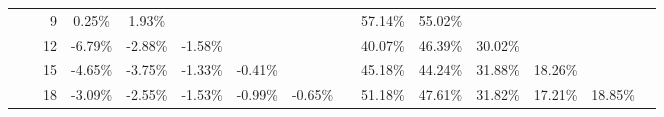 \begin{table}[t]
{\begin{tabular}{ccrcccccccccccc}
          & \textcolor[rgb]{ .502,  .502,  .502}{} & 9     & \cellcolor[rgb]{ .988,  .988,  1}0.25\% & \cellcolor[rgb]{ .969,  .976,  .996}1.93\% &       &       &       &       & \cellcolor[rgb]{ .353,  .541,  .776}57.14\% & \cellcolor[rgb]{ .38,  .561,  .788}55.02\% &       &       &       &  \\
          & \textcolor[rgb]{ .502,  .502,  .502}{} & 12    & \cellcolor[rgb]{ .984,  .843,  .855}-6.79\% & \cellcolor[rgb]{ .984,  .925,  .937}-2.88\% & \cellcolor[rgb]{ .984,  .953,  .965}-1.58\% &       &       &       & \cellcolor[rgb]{ .545,  .678,  .847}40.07\% & \cellcolor[rgb]{ .475,  .627,  .82}46.39\% & \cellcolor[rgb]{ .655,  .757,  .886}30.02\% &       &       &  \\
          & \textcolor[rgb]{ .502,  .502,  .502}{} & 15    & \cellcolor[rgb]{ .984,  .89,  .898}-4.65\% & \cellcolor[rgb]{ .984,  .906,  .918}-3.75\% & \cellcolor[rgb]{ .984,  .957,  .969}-1.33\% & \cellcolor[rgb]{ .984,  .976,  .988}-0.41\% &       &       & \cellcolor[rgb]{ .486,  .635,  .824}45.18\% & \cellcolor[rgb]{ .498,  .643,  .827}44.24\% & \cellcolor[rgb]{ .635,  .741,  .878}31.88\% & \cellcolor[rgb]{ .788,  .847,  .929}18.26\% &       &  \\
          & \textcolor[rgb]{ .502,  .502,  .502}{} & 18    & \cellcolor[rgb]{ .984,  .922,  .933}-3.09\% & \cellcolor[rgb]{ .984,  .933,  .945}-2.55\% & \cellcolor[rgb]{ .984,  .953,  .965}-1.53\% & \cellcolor[rgb]{ .984,  .965,  .976}-0.99\% & \cellcolor[rgb]{ .984,  .973,  .984}-0.65\% &       & \cellcolor[rgb]{ .42,  .588,  .8}51.18\% & \cellcolor[rgb]{ .463,  .62,  .816}47.61\% & \cellcolor[rgb]{ .635,  .741,  .878}31.82\% & \cellcolor[rgb]{ .8,  .855,  .933}17.21\% & \cellcolor[rgb]{ .78,  .843,  .929}18.85\% &  \\
    

\end{tabular}}
\end{table}
